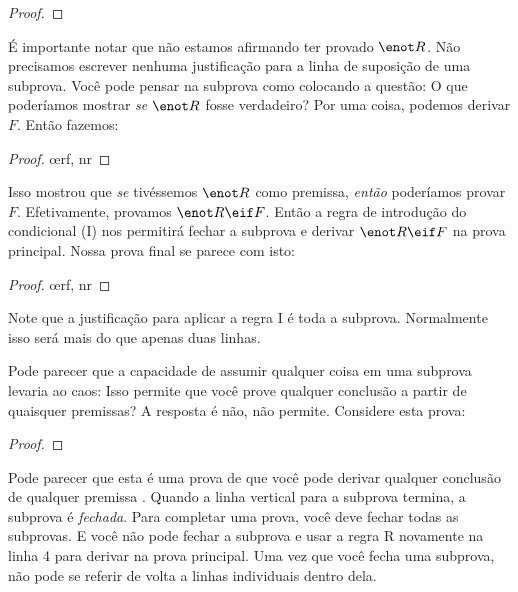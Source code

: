 \begin{proof}
	\open
	\close
\end{proof}

É importante notar que não estamos afirmando ter provado $\enot R$. Não precisamos escrever nenhuma justificação para a linha de suposição de uma subprova. Você pode pensar na subprova como colocando a questão: O que poderíamos mostrar \emph{se} $\enot R$ fosse verdadeiro? Por uma coisa, podemos derivar $F$. Então fazemos:

\begin{proof}
	\open
		\oe{rf, nr}
	\close
\end{proof}

Isso mostrou que \emph{se} tivéssemos $\enot R$ como premissa, \emph{então} poderíamos provar $F$. Efetivamente, provamos $\enot R \eif F$. Então a regra de introdução do condicional ({\eif}I) nos permitirá fechar a subprova e derivar $\enot R \eif F$ na prova principal. Nossa prova final se parece com isto:

\begin{proof}
	\open
		\oe{rf, nr}
	\close
\end{proof}


Note que a justificação para aplicar a regra {\eif}I é toda a subprova. Normalmente isso será mais do que apenas duas linhas.

Pode parecer que a capacidade de assumir qualquer coisa em uma subprova levaria ao caos: Isso permite que você prove qualquer conclusão a partir de quaisquer premissas? A resposta é não, não permite. Considere esta prova:

\begin{proof}
	\open
		 
	\close
\end{proof}

Pode parecer que esta é uma prova de que você pode derivar qualquer conclusão  de qualquer premissa . Quando a linha vertical para a subprova termina, a subprova é \emph{fechada}. Para completar uma prova, você deve fechar todas as subprovas. E você não pode fechar a subprova e usar a regra R novamente na linha 4 para derivar  na prova principal. Uma vez que você fecha uma subprova, não pode se referir de volta a linhas individuais dentro dela.

